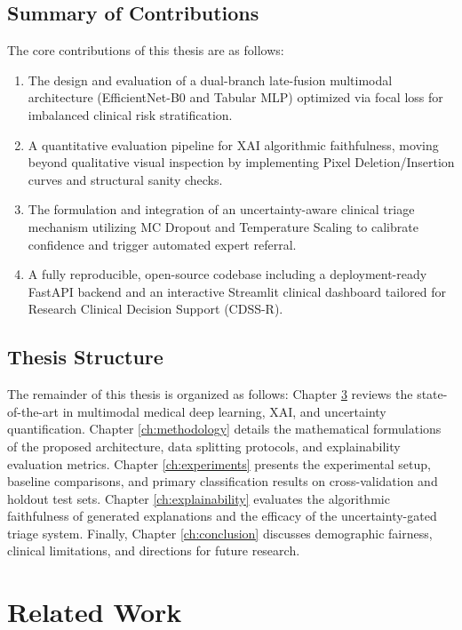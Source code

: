 \documentclass[12pt,a4paper]{report}
\begin{document}
	\section{Summary of Contributions}
	The core contributions of this thesis are as follows:
	\begin{enumerate}
		\item The design and evaluation of a dual-branch late-fusion multimodal architecture (EfficientNet-B0 and Tabular MLP) optimized via focal loss for imbalanced clinical risk stratification.
		\item A quantitative evaluation pipeline for XAI algorithmic faithfulness, moving beyond qualitative visual inspection by implementing Pixel Deletion/Insertion curves and structural sanity checks.
		\item The formulation and integration of an uncertainty-aware clinical triage mechanism utilizing MC Dropout and Temperature Scaling to calibrate confidence and trigger automated expert referral.
		\item A fully reproducible, open-source codebase including a deployment-ready FastAPI backend and an interactive Streamlit clinical dashboard tailored for Research Clinical Decision Support (CDSS-R).
	\end{enumerate}
	
	\section{Thesis Structure}
	The remainder of this thesis is organized as follows: Chapter \ref{ch:related_work} reviews the state-of-the-art in multimodal medical deep learning, XAI, and uncertainty quantification. Chapter \ref{ch:methodology} details the mathematical formulations of the proposed architecture, data splitting protocols, and explainability evaluation metrics. Chapter \ref{ch:experiments} presents the experimental setup, baseline comparisons, and primary classification results on cross-validation and holdout test sets. Chapter \ref{ch:explainability} evaluates the algorithmic faithfulness of generated explanations and the efficacy of the uncertainty-gated triage system. Finally, Chapter \ref{ch:conclusion} discusses demographic fairness, clinical limitations, and directions for future research.
	
	\chapter{Related Work}
	\label{ch:related_work}
	
\end{document}
